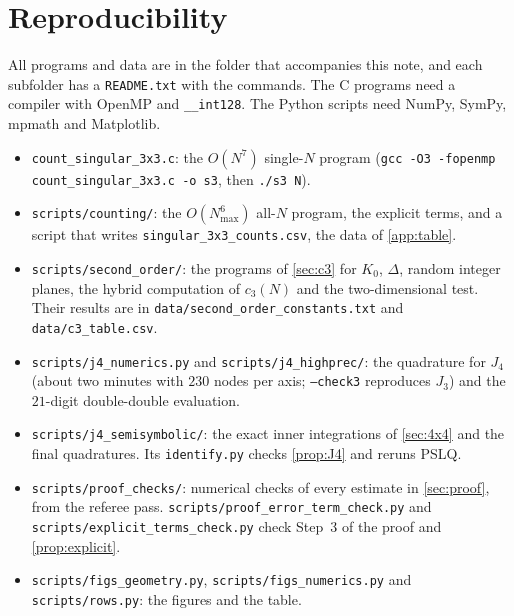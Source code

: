 \documentclass[11pt]{article}
\theoremstyle{definition}
\begin{document}
\section{Reproducibility}\label{app:repro}
\raggedright
All programs and data are in the folder that accompanies this note, and each subfolder has a \texttt{README.txt} with the commands. The C programs need a compiler with OpenMP and \texttt{\_\_int128}. The Python scripts need NumPy, SymPy, mpmath and Matplotlib.
\begin{itemize}
\item \texttt{count\_singular\_3x3.c}: the $O(N^7)$ single-$N$ program (\texttt{gcc -O3 -fopenmp count\_singular\_3x3.c -o s3}, then \texttt{./s3 N}).
\item \texttt{scripts/counting/}: the $O(N_{\max}^6)$ all-$N$ program, the explicit terms, and a script that writes \texttt{singular\_3x3\_counts.csv}, the data of \cref{app:table}.
\item \texttt{scripts/second\_order/}: the programs of \cref{sec:c3} for $K_0$, $\Delta$, random integer planes, the hybrid computation of $c_3(N)$ and the two-dimensional test. Their results are in \texttt{data/second\_order\_constants.txt} and \texttt{data/c3\_table.csv}.
\item \texttt{scripts/j4\_numerics.py} and \texttt{scripts/j4\_highprec/}: the quadrature for $J_4$ (about two minutes with $230$ nodes per axis; \texttt{--check3} reproduces $J_3$) and the $21$-digit double-double evaluation.
\item \texttt{scripts/j4\_semisymbolic/}: the exact inner integrations of \cref{sec:4x4} and the final quadratures. Its \texttt{identify.py} checks \cref{prop:J4} and reruns PSLQ.
\item \texttt{scripts/proof\_checks/}: numerical checks of every estimate in \cref{sec:proof}, from the referee pass. \texttt{scripts/proof\_error\_term\_check.py} and \texttt{scripts/explicit\_terms\_check.py} check Step~3 of the proof and \cref{prop:explicit}.
\item \texttt{scripts/figs\_geometry.py}, \texttt{scripts/figs\_numerics.py} and \texttt{scripts/rows.py}: the figures and the table.
\end{itemize}
\end{document}
